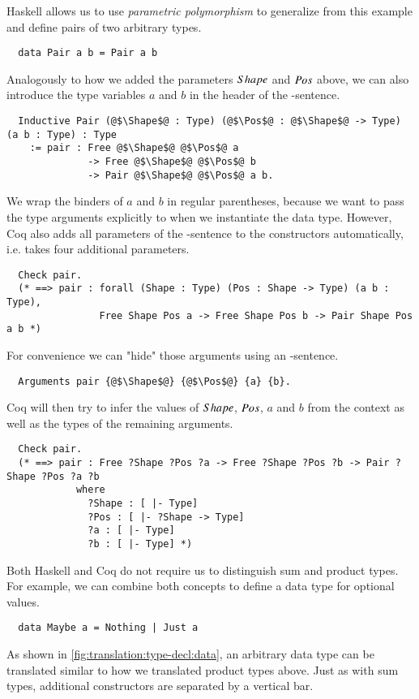 Haskell allows us to use \textit{parametric polymorphism} to generalize from this example and define pairs of two arbitrary types.
\begin{verbatim}
  data Pair a b = Pair a b
\end{verbatim}
Analogously to how we added the parameters $Shape$ and $Pos$ above, we can also introduce the type variables $a$ and $b$ in the header of the -sentence.
\begin{verbatim}
  Inductive Pair (@$\Shape$@ : Type) (@$\Pos$@ : @$\Shape$@ -> Type) (a b : Type) : Type
    := pair : Free @$\Shape$@ @$\Pos$@ a
              -> Free @$\Shape$@ @$\Pos$@ b
              -> Pair @$\Shape$@ @$\Pos$@ a b.
\end{verbatim}
We wrap the binders of $a$ and $b$ in regular parentheses, because we want to pass the type arguments explicitly to  when we instantiate the data type.
However, Coq also adds all parameters of the -sentence to the constructors automatically, i.e.  takes four additional parameters.
\begin{verbatim}
  Check pair.
  (* ==> pair : forall (Shape : Type) (Pos : Shape -> Type) (a b : Type),
                Free Shape Pos a -> Free Shape Pos b -> Pair Shape Pos a b *)
\end{verbatim}
For convenience we can "hide" those arguments using an -sentence.
\begin{verbatim}
  Arguments pair {@$\Shape$@} {@$\Pos$@} {a} {b}.
\end{verbatim}
Coq will then try to infer the values of $Shape$, $Pos$, $a$ and $b$ from the context as well as the types of the remaining arguments.
\begin{verbatim}
  Check pair.
  (* ==> pair : Free ?Shape ?Pos ?a -> Free ?Shape ?Pos ?b -> Pair ?Shape ?Pos ?a ?b
            where
              ?Shape : [ |- Type]
              ?Pos : [ |- ?Shape -> Type]
              ?a : [ |- Type]
              ?b : [ |- Type] *)
\end{verbatim}

Both Haskell and Coq do not require us to distinguish sum and product types.
For example, we can combine both concepts to define a data type for optional values.
\begin{verbatim}
  data Maybe a = Nothing | Just a
\end{verbatim}
As shown in \autoref{fig:translation:type-decl:data}, an arbitrary data type can be translated similar to how we translated product types above.
Just as with sum types, additional constructors are separated by a vertical bar.


